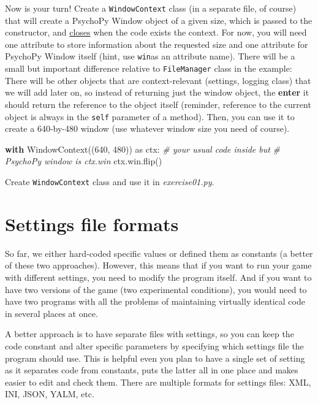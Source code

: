 \documentclass[
]{book}
\newenvironment{Shaded}{\begin{snugshade}}{\end{snugshade}}
\newcommand{\CommentTok}[1]{\textcolor[rgb]{0.56,0.35,0.01}{\textit{#1}}}
\newcommand{\ControlFlowTok}[1]{\textcolor[rgb]{0.13,0.29,0.53}{\textbf{#1}}}
\newcommand{\DecValTok}[1]{\textcolor[rgb]{0.00,0.00,0.81}{#1}}
\newcommand{\ImportTok}[1]{#1}
\newcommand{\NormalTok}[1]{#1}
\begin{document}
Now is your turn! Create a \texttt{WindowContext} class (in a separate file, of course) that will create a PsychoPy Window object of a given size, which is passed to the constructor, and \href{https://psychopy.org/api/visual/window.html\#psychopy.visual.Window.close}{closes} when the code exists the context. For now, you will need one attribute to store information about the requested size and one attribute for PsychoPy Window itself (hint, use \texttt{win}as an attribute name). There will be a small but important difference relative to \texttt{FileManager} class in the example: There will be other objects that are context-relevant (settings, logging class) that we will add later on, so instead of returning just the window object, the \textbf{enter} it should return the reference to the object itself (reminder, reference to the current object is always in the \texttt{self} parameter of a method). Then, you can use it to create a 640-by-480 window (use whatever window size you need of course).

\begin{Shaded}
\begin{Highlighting}[]
\ControlFlowTok{with}\NormalTok{ WindowContext((}\DecValTok{640}\NormalTok{, }\DecValTok{480}\NormalTok{)) }\ImportTok{as}\NormalTok{ ctx:}
  \CommentTok{\# your usual code inside but}
  \CommentTok{\# PsychoPy window is ctx.win}
\NormalTok{  ctx.win.flip()}
\end{Highlighting}
\end{Shaded}

Create \texttt{WindowContext} class and use it in \emph{exercise01.py}.

\hypertarget{settings-files}{%
\section{Settings file formats}\label{settings-files}}

So far, we either hard-coded specific values or defined them as constants (a better of these two approaches). However, this means that if you want to run your game with different settings, you need to modify the program itself. And if you want to have two versions of the game (two experimental conditions), you would need to have two programs with all the problems of maintaining virtually identical code in several places at once.

A better approach is to have separate files with settings, so you can keep the code constant and alter specific parameters by specifying which settings file the program should use. This is helpful even you plan to have a single set of setting as it separates code from constants, puts the latter all in one place and makes easier to edit and check them. There are multiple formats for settings files: XML, INI, JSON, YALM, etc.
\end{document}
